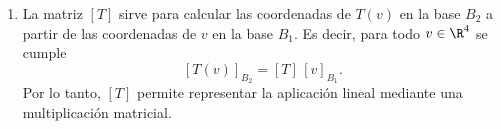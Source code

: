 \documentclass[11pt,respuestas,a4]{aleph-examen}
\begin{document}
\begin{preguntas}
\begin{respuesta}
\begin{enumerate}
        Para determinar la matriz asociada a la aplicación lineal $T$ debemos calcular la
        imagen de cada vector de la base $B_1$ y luego expresar cada imagen en la base
        $B_2$. Esos vectores de coordenadas forman las columnas de $[T]$.
        Así, se tiene que
        \[
            [T] = \begin{pmatrix}
                3 & 1 & 0 & 0 \\
                2 & 3 & 1 & 0 \\
                0 & 2 & 3 & 2 \\
                1 & 0 & 2 & 2
            \end{pmatrix}.
        \]
    \item 
        La matriz $[T]$ sirve para calcular las coordenadas de $T(v)$ en la base $B_2$ a
        partir de las coordenadas de $v$ en la base $B_1$. Es decir, para todo
        $v\in\R^4$ se cumple
        \[
            [T(v)]_{B_2}=[T]\,[v]_{B_1}.
        \]
        Por lo tanto, $[T]$ permite representar la aplicación lineal mediante una
        multiplicación matricial. \qedhere
    \end{enumerate}
\end{respuesta}

\end{preguntas}
\end{document}
